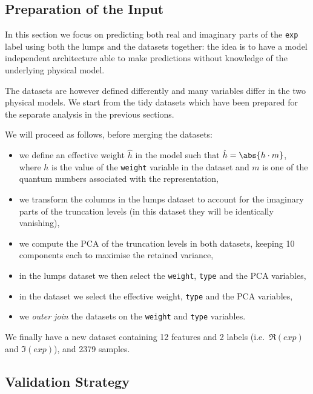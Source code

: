 \subsection{Preparation of the Input}

In this section we focus on predicting both real and imaginary parts of the \texttt{exp} label using both the lumps and the \wzw datasets together: the idea is to have a model independent architecture able to make predictions without knowledge of the underlying physical model.

The datasets are however defined differently and many variables differ in the two physical models.
We start from the tidy datasets which have been prepared for the separate analysis in the previous sections.

We will proceed as follows, before merging the datasets:
\begin{itemize}
  \item we define an effective weight $\hat{h}$ in the \wzw model such that $\hat{h} = \abs{h \cdot m}$, where $h$ is the value of the \texttt{weight} variable in the dataset and $m$ is one of the quantum numbers associated with the  representation,\footnotemark{}
  \item we transform the columns in the lumps dataset to account for the imaginary parts of the truncation levels (in this dataset they will be identically vanishing),
  \item we compute the PCA of the truncation levels in both datasets, keeping 10 components each to maximise the retained variance,
  \item in the lumps dataset we then select the \texttt{weight}, \texttt{type} and the PCA variables,
  \item in the \wzw dataset we select the effective weight, \texttt{type} and the PCA variables,
  \item we \emph{outer join} the datasets on the \texttt{weight} and \texttt{type} variables.
\end{itemize}
We finally have a new dataset containing 12 features and 2 labels (i.e.\ $\Re(exp)$ and $\Im(exp)$), and 2379 samples.


\subsection{Validation Strategy}

